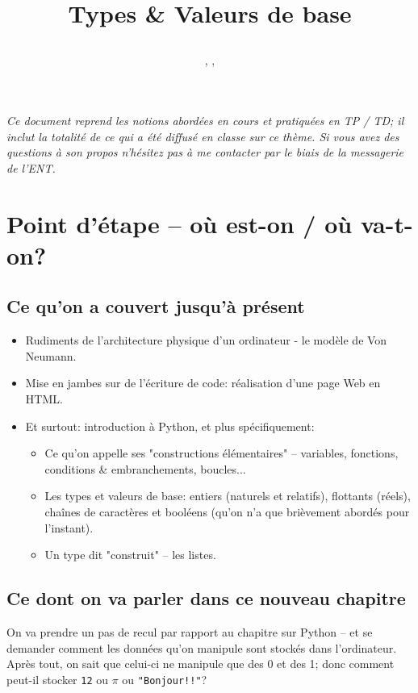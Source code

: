 \documentclass[12pt]{article}
\title
	{\vspace{3cm}
		{\Large
		\textit
			{
				\classe\hspace{0.1cm}
				\textemdash\
				\hspace{0.1cm}
				\themecours
			}
			
		\vspace{1cm}
		\huge{Types \& Valeurs de base} }
		 
		\vspace{1cm}
	}
\author{\etablissement}
\date{
	\auteur,
	\datedoc,
	\footnotesize{\textit{\versiondoc}} 
	\vspace{6cm}
	}
\newcommand{\resumecours}{\textit{Ce document reprend les notions abordées en cours et pratiquées en TP / TD; il inclut la totalité de ce qui a été diffusé en classe sur ce thème. Si vous avez des questions à son propos n'hésitez pas à me contacter par le biais de la messagerie de l'ENT.
}}
\begin{document}
	
	\maketitle
	\thispagestyle{empty}
		
	\section*{}
		{\noindent
		\resumecours
		}
		
	\pagebreak	
	\tableofcontents
	
	\pagebreak
	
	\section{Point d'étape -- où est-on / où va-t-on?}
	\subsection{Ce qu'on a couvert jusqu'à présent}
	
	\begin{itemize}
		\item Rudiments de l'architecture physique d'un ordinateur - le modèle de Von Neumann.
		\item Mise en jambes sur de l'écriture de code: réalisation d'une page Web en HTML.
		\item Et surtout: introduction à Python, et plus spécifiquement:
		\begin{itemize}
			\item Ce qu'on appelle ses "constructions élémentaires" -- variables, fonctions, conditions \& embranchements, boucles...
			\item Les types et valeurs de base: entiers (naturels et relatifs), flottants (réels), chaînes de caractères et booléens (qu'on n'a que brièvement abordés pour l'instant).
			\item Un type dit "construit" -- les listes.
		\end{itemize}
	\end{itemize}
	
	\subsection{Ce dont on va parler dans ce nouveau chapitre}
	On va prendre un pas de recul par rapport au chapitre sur Python -- et se demander comment les données qu'on manipule sont stockés dans l'ordinateur. Après tout, on sait que celui-ci ne manipule que des 0 et des 1; donc comment peut-il stocker \texttt{12} ou \texttt{$\pi$} ou \texttt{"Bonjour!!"}? 
	
\end{document}
